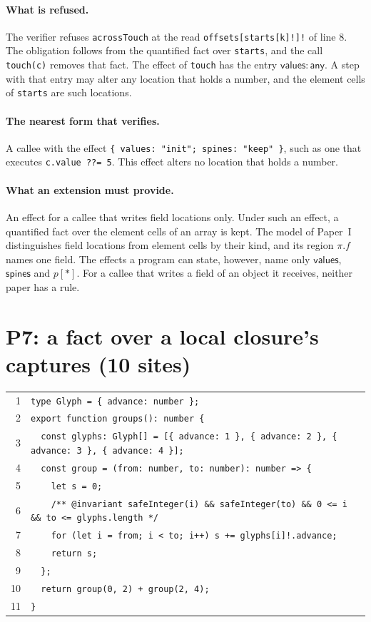 \documentclass[10pt,a4paper]{article}
\theoremstyle{definition}
\theoremstyle{remark}
\newcommand{\kw}[1]{\mathsf{#1}}
\newcommand{\any}{\kw{any}}
\newcommand{\val}{\kw{values}}
\newcommand{\st}{\kw{spines}}
\newcommand{\code}[1]{\texttt{#1}}
\newcommand{\entry}[1]{\paragraph{#1.}}
\begin{document}
\entry{What is refused} The verifier refuses \code{acrossTouch} at the read
\code{offsets[starts[k]!]!} of line 8. The obligation follows from the
quantified fact over \code{starts}, and the call \code{touch(c)}
removes that fact. The effect of \code{touch} has the entry
$\val:\any$. A step with that entry may alter any location that holds
a number, and the element cells of \code{starts} are such locations.

\entry{The nearest form that verifies} A callee with the effect
\code{\{ values: "init"; spines: "keep" \}}, such as one that executes
\code{c.value ??= 5}. This effect alters no location that holds a
number.

\entry{What an extension must provide} An effect for a callee that writes field locations only.
Under such an effect, a quantified fact over the element cells of an
array is kept. The model of Paper~I distinguishes field locations from
element cells by their kind, and its region $\pi.f$ names one field.
The effects a program can state, however, name only $\val$, $\st$ and
$p[\ast]$. For a callee that writes a field of an object it receives, neither
paper has a rule.

\section{P7: a fact over a local closure's captures (10 sites)}

{\footnotesize
\begin{tabular}{@{}r@{\hspace{1em}}l@{}}
1 & \code{type Glyph = \{ advance: number \};} \\
2 & \code{export function groups(): number \{} \\
3 & \code{~~const glyphs: Glyph[] = [\{ advance: 1 \}, \{ advance: 2 \}, \{ advance: 3 \}, \{ advance: 4 \}];} \\
4 & \code{~~const group = (from: number, to: number): number => \{} \\
5 & \code{~~~~let s = 0;} \\
6 & \code{~~~~/** @invariant safeInteger(i) \&\& safeInteger(to) \&\& 0 <= i \&\& to <= glyphs.length */} \\
7 & \code{~~~~for (let i = from; i < to; i++) s += glyphs[i]!.advance;} \\
8 & \code{~~~~return s;} \\
9 & \code{~~\};} \\
10 & \code{~~return group(0, 2) + group(2, 4);} \\
11 & \code{\}} \\
\end{tabular}}
\end{document}
